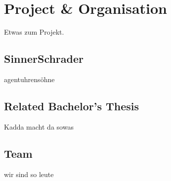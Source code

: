 \chapter{Project \& Organisation}
Etwas zum Projekt.

\section{SinnerSchrader}
agentuhrensöhne

\section{Related Bachelor's Thesis}
Kadda macht da sowas

\section{Team}
wir sind so leute
